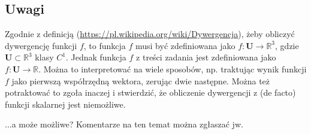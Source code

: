 \documentclass[12pt]{article}
\begin{document}
\subsection{Uwagi}
Zgodnie z definicją (\url{https://pl.wikipedia.org/wiki/Dywergencja}), żeby obliczyć dywergencję funkcji $f$, to funkcja $f$ musi być zdefiniowana jako $f: \mathbf{U} \to \mathbb{R}^3$, gdzie $\mathbf{U} \subset \mathbb{R}^3$ klasy $C^1$. Jednak funkcja $f$ z treści zadania jest zdefiniowana jako $f: \mathbf{U} \to \mathbb{R}$. Można to interpretować na wiele sposobów, np. traktując wynik funkcji $f$ jako pierwszą współrzędną wektora, zerując dwie następne. Można też potraktować to zgoła inaczej i stwierdzić, że obliczenie dywergencji z (de facto) funkcji skalarnej jest niemożliwe.

...a może możliwe? Komentarze na ten temat można zgłaszać jw.
\end{document}
